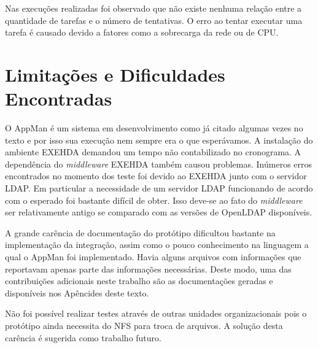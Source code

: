Nas execuções realizadas foi observado que não existe nenhuma relação entre a quantidade de tarefas e o número de tentativas. O erro ao tentar executar uma tarefa é causado devido a fatores como a sobrecarga da rede ou de CPU.

\section{Limitações e Dificuldades Encontradas}

O AppMan é um sistema em desenvolvimento como já citado algumas vezes no texto e por isso sua execução nem sempre era o que esperávamos. A instalação do ambiente EXEHDA demandou um tempo não contabilizado no cronograma. A dependência do \emph{middleware} EXEHDA também causou problemas. Inúmeros erros encontrados no momento dos teste foi devido ao EXEHDA junto com o servidor LDAP. Em particular a necessidade de um servidor LDAP funcionando de acordo com o esperado foi bastante difícil de obter. Isso deve-se ao fato do \emph{middleware} ser relativamente antigo se comparado com as versões de OpenLDAP disponíveis.

A grande carência de documentação do protótipo dificultou bastante na implementação da integração, assim como o pouco conhecimento na linguagem a qual o AppMan foi implementado. Havia alguns arquivos com informações que reportavam apenas parte das informações necessárias. Deste modo, uma das contribuições adicionais neste trabalho são as documentações geradas e disponíveis nos Apêncides deste texto.

Não foi possível realizar testes através de outras unidades organizacionais pois o protótipo ainda necessita do NFS para troca de arquivos. A solução desta carência é sugerida como trabalho futuro.